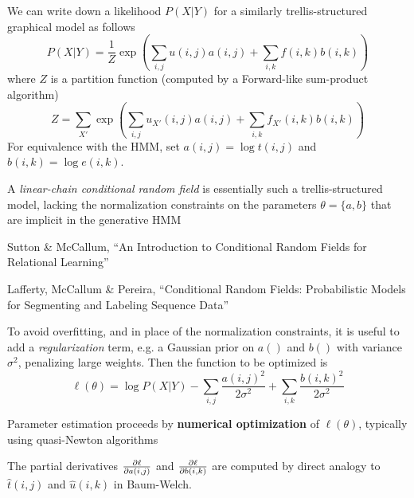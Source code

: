 \documentclass{beamer}
\begin{document}
\begin{frame}{}
\itemb
\item We can write down a likelihood $P(X|Y)$ for a similarly trellis-structured graphical model as follows
\[
P(X|Y) = \frac{1}{Z} \exp \left( \sum_{i,j} u(i,j) a(i,j) + \sum_{i,k} f(i,k) b(i,k) \right)
\]
where $Z$ is a partition function (computed by a Forward-like sum-product algorithm)
\[
Z = \sum_{X'} \exp \left( \sum_{i,j} u_{X'}(i,j) a(i,j) + \sum_{i,k} f_{X'}(i,k) b(i,k) \right)
\]
For equivalence with the HMM, set $a(i,j)=\log t(i,j)$ and $b(i,k)=\log e(i,k)$.
\iteme
\end{frame}{}

\begin{frame}
\itemb
\item A {\em linear-chain conditional random field} is essentially such a trellis-structured model,
lacking the normalization constraints on the parameters $\theta=\{a,b\}$ that are implicit in the generative HMM
 \itemb
 \item Sutton \& McCallum, ``An Introduction to Conditional Random Fields for Relational Learning''
 \item Lafferty, McCallum \& Pereira, ``Conditional Random Fields: Probabilistic Models for Segmenting and Labeling Sequence Data''
 \iteme
\item To avoid overfitting, and in place of the normalization constraints,
it is useful to add a {\em regularization} term, e.g. a Gaussian prior on $a()$ and $b()$ with variance $\sigma^2$, penalizing large weights.
Then the function to be optimized is
\[
\ell(\theta) = \log P(X|Y) - \sum_{i,j} \frac{a(i,j)^2}{2\sigma^2} + \sum_{i,k} \frac{b(i,k)^2}{2\sigma^2}
\]
\iteme
\end{frame}

\begin{frame}
\itemb
\item Parameter estimation proceeds by {\bf numerical optimization} of $\ell(\theta)$, typically using quasi-Newton algorithms
\item The partial derivatives $\frac{\partial {\ell}}{\partial {a(i,j)}}$ and $\frac{\partial {\ell}}{\partial {b(i,k)}}$ are computed by direct analogy to $\hat{t}(i,j)$ and $\hat{u}(i,k)$ in Baum-Welch.
\iteme
\end{frame}{}
\end{document}
